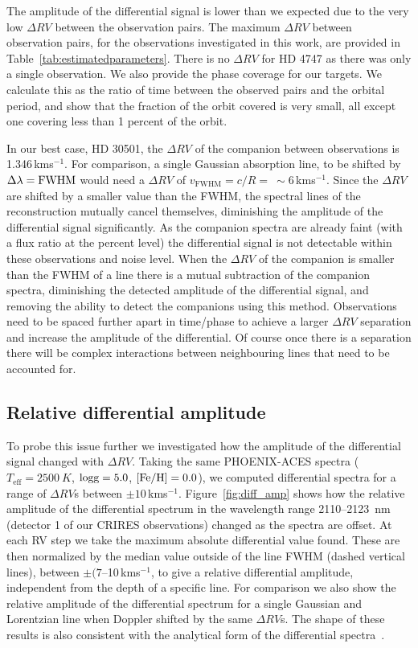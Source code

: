 \documentclass[fleqn,usenatbib]{mnras}
\newcommand{\kmps}{\,kms\(^{-1}\)}	%
\begin{document}
    The amplitude of the differential signal is lower than we expected due to the very low \(\Delta RV\) between the observation pairs. The maximum \(\Delta RV\) between observation pairs, for the observations investigated in this work, are provided in Table~\ref{tab:estimatedparameters}. {There is no \(\Delta RV\) for {HD 4747} as there was only a single observation. We also provide the phase coverage for our targets. We calculate this as the ratio of time between the observed pairs and the orbital period, and show that the fraction of the orbit covered is very small, all except one covering less than 1 percent of the orbit.}

    In our best case, {HD 30501}, the \(\Delta RV\) of the companion between observations is 1.346\kmps{}. For comparison, a single Gaussian absorption line, to be shifted by \(\Delta\lambda = \rm FWHM\) would need a \(\Delta RV\) of \(v_{\textrm{FWHM}} = c/R =~\sim\)6\kmps{}. Since the \(\Delta RV\) are shifted by a smaller value than the FWHM, the spectral lines of the reconstruction mutually cancel themselves, diminishing the amplitude of the differential signal significantly. As the companion spectra are already faint (with a flux ratio at the percent level) the differential signal is not detectable within these observations and noise level.
    When the \(\Delta RV\) of the companion is smaller than the FWHM of a line there is a mutual subtraction of the companion spectra, diminishing the detected amplitude of the differential signal, and removing the ability to detect the companions using this method. Observations need to be spaced further apart in time/phase to achieve a larger \(\Delta RV\) separation and increase the amplitude of the differential. Of course once there is a separation there will be complex interactions between neighbouring lines that need to be accounted for.

    \subsection{Relative differential amplitude}
    To probe this issue further we investigated how the amplitude of the differential signal changed with \(\Delta RV\). Taking the same PHOENIX-ACES spectra (\(T_{\textrm{eff}} = 2500~K\), \(\rm logg=5.0\), \(\rm [Fe/H]=0.0\)), we computed differential spectra for a range of \(\Delta RV\)s between \(\pm10\)\kmps{}. Figure~\ref{fig:diff_amp} shows how the relative amplitude of the differential spectrum in the wavelength range 2110--2123~nm (detector 1 of our CRIRES observations) changed as the spectra are offset. At each RV step we take the maximum absolute differential value found. These are then normalized by the median value outside of the line FWHM (dashed vertical lines), between \(\pm(7\)--10\kmps{}, to give a relative differential amplitude, independent from the depth of a specific line. For comparison we also show the relative amplitude of the differential spectrum for a single Gaussian and Lorentzian line when Doppler shifted by the same \(\Delta RV\)s. The shape of these results is also consistent with the analytical form of the differential spectra~\citet[][eqn.~A.1]{ferluga_separating_1997}.
\end{document}
